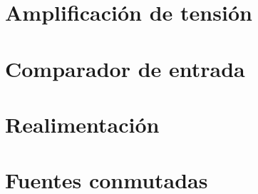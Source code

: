 \documentclass[10pt,a4paper]{article}
\begin{document}
		\section{Amplificación de tensión}
			

		\section{Comparador de entrada}
			

		\section{Realimentación}
			

		\section{Fuentes conmutadas}
			

%			
						
\end{document}

